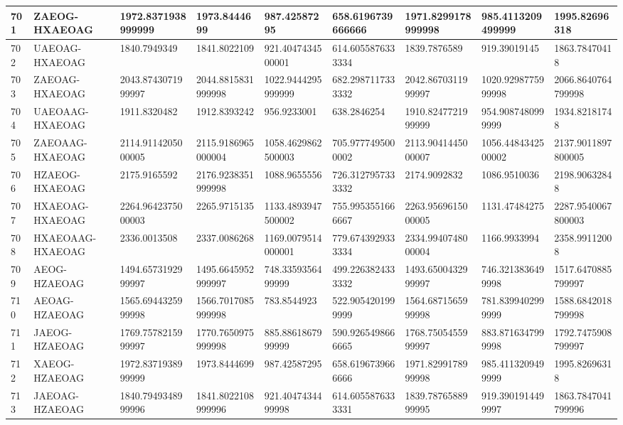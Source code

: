{\begin{longtable}{|l|l|l|l|l|l|l|l|l|}
        701 & ZAEOG-HXAEOAG & 1972.8371938999999 & 1973.8444699 & 987.42587295 & 658.6196739666666 & 1971.8299178999998 & 985.4113209499999 & 1995.82696318 \\ \hline
        702 & UAEOAG-HXAEOAG & 1840.7949349 & 1841.8022109 & 921.4047434500001 & 614.6055876333334 & 1839.7876589 & 919.39019145 & 1863.78470418 \\ \hline
        703 & ZAEOAG-HXAEOAG & 2043.8743071999997 & 2044.8815831999998 & 1022.9444295999999 & 682.2987117333332 & 2042.8670311999997 & 1020.9298775999998 & 2066.8640764799998 \\ \hline
        704 & UAEOAAG-HXAEOAG & 1911.8320482 & 1912.8393242 & 956.9233001 & 638.2846254 & 1910.8247721999999 & 954.9087480999999 & 1934.82181748 \\ \hline
        705 & ZAEOAAG-HXAEOAG & 2114.9114205000005 & 2115.9186965000004 & 1058.4629862500003 & 705.9777495000002 & 2113.9041445000007 & 1056.4484342500002 & 2137.9011897800005 \\ \hline
        706 & HZAEOG-HXAEOAG & 2175.9165592 & 2176.9238351999998 & 1088.9655556 & 726.3127957333332 & 2174.9092832 & 1086.9510036 & 2198.90632848 \\ \hline
        707 & HXAEOAG-HXAEOAG & 2264.9642375000003 & 2265.9715135 & 1133.4893947500002 & 755.9953551666667 & 2263.9569615000005 & 1131.47484275 & 2287.9540067800003 \\ \hline
        708 & HXAEOAAG-HXAEOAG & 2336.0013508 & 2337.0086268 & 1169.0079514000001 & 779.6743929333334 & 2334.9940748000004 & 1166.9933994 & 2358.99112008 \\ \hline
        709 & AEOG-HZAEOAG & 1494.6573192999997 & 1495.6645952999997 & 748.3359356499999 & 499.2263824333332 & 1493.6500432999997 & 746.3213836499998 & 1517.6470885799997 \\ \hline
        710 & AEOAG-HZAEOAG & 1565.6944325999998 & 1566.7017085999998 & 783.8544923 & 522.9054201999999 & 1564.6871565999998 & 781.8399402999999 & 1588.6842018799998 \\ \hline
        711 & JAEOG-HZAEOAG & 1769.7578215999997 & 1770.7650975999998 & 885.8861867999999 & 590.9265498666665 & 1768.7505455999997 & 883.8716347999998 & 1792.7475908799997 \\ \hline
        712 & XAEOG-HZAEOAG & 1972.8371938999999 & 1973.8444699 & 987.42587295 & 658.6196739666666 & 1971.8299178999998 & 985.4113209499999 & 1995.82696318 \\ \hline
        713 & JAEOAG-HZAEOAG & 1840.7949348999996 & 1841.8022108999996 & 921.4047434499998 & 614.6055876333331 & 1839.7876588999995 & 919.3901914499997 & 1863.7847041799996 \\ \hline

\end{longtable}}
